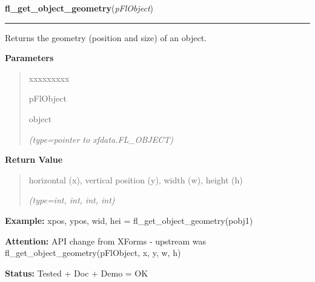     \vspace{0.5ex}

\hspace{.8\funcindent}\begin{boxedminipage}{\funcwidth}

    \raggedright \textbf{fl\_get\_object\_geometry}(\textit{pFlObject})

    \vspace{-1.5ex}

    \rule{\textwidth}{0.5\fboxrule}
\setlength{\parskip}{2ex}
    Returns the geometry (position and size) of an object.

\setlength{\parskip}{1ex}
      \textbf{Parameters}
      \vspace{-1ex}

      \begin{quote}
        \begin{Ventry}{xxxxxxxxx}

          \item[pFlObject]

          object

            {\it (type=pointer to xfdata.FL\_OBJECT)}

        \end{Ventry}

      \end{quote}

      \textbf{Return Value}
    \vspace{-1ex}

      \begin{quote}
      horizontal (x), vertical position (y), width (w), height (h)

      {\it (type=int, int, int, int)}

      \end{quote}

\textbf{Example:} xpos, ypos, wid, hei = fl\_get\_object\_geometry(pobj1)



\textbf{Attention:} API change from XForms - upstream was fl\_get\_object\_geometry(pFlObject, 
x, y, w, h)



\textbf{Status:} Tested + Doc + Demo = OK



    \end{boxedminipage}

    \label{xformslib:flbasic:fl_get_object_position}

